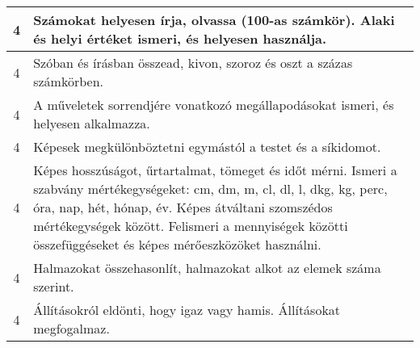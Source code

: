 \begin{longtable}{c | p{} }
                                
                                          4 &  Számokat helyesen írja, olvassa (100-as számkör). Alaki és helyi értéket ismeri, és helyesen használja. \\ \hline
                                          4 &  Szóban és írásban összead, kivon, szoroz és oszt a százas számkörben. \\ \hline
                                          4 &  A műveletek sorrendjére vonatkozó megállapodásokat ismeri, és helyesen alkalmazza. \\ \hline
                                          4 &  Képesek megkülönböztetni egymástól a testet és a síkidomot. \\ \hline
                                          4 &  Képes hosszúságot, űrtartalmat, tömeget és időt mérni. Ismeri a szabvány mértékegységeket: cm, dm, m, cl, dl, l, dkg, kg, perc, óra, nap, hét, hónap, év. Képes átváltani szomszédos mértékegységek között. Felismeri a mennyiségek közötti összefüggéseket és képes mérőeszközöket használni. \\ \hline
                                          4 &  Halmazokat összehasonlít, halmazokat alkot az elemek száma szerint. \\ \hline
                                          4 &  Állításokról eldönti, hogy igaz vagy hamis. Állításokat megfogalmaz. \\ \hline
                                      
                        \end{longtable}
            \clearpage

